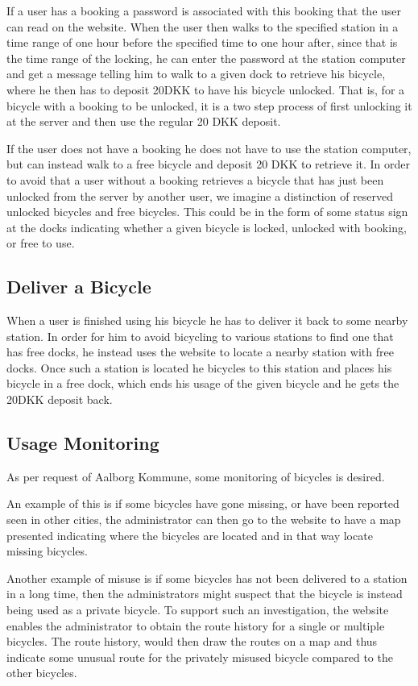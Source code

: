 If a user has a booking a password is associated with this booking that the user can read on the website.
When the user then walks to the specified station in a time range of one hour before the specified time to one hour after, since that is the time range of the locking, he can enter the password at the station computer and get a message telling him to walk to a given dock to retrieve his bicycle, where he then has to deposit 20DKK to have his bicycle unlocked.
That is, for a bicycle with a booking to be unlocked, it is a two step process of first unlocking it at the server and then use the regular 20 DKK deposit.

If the user does not have a booking he does not have to use the station computer, but can instead walk to a free bicycle and deposit 20 DKK to retrieve it.
In order to avoid that a user without a booking retrieves a bicycle that has just been unlocked from the server by another user, we imagine a distinction of reserved unlocked bicycles and free bicycles.
This could be in the form of some status sign at the docks indicating whether a given bicycle is locked, unlocked with booking, or free to use.

\subsection{Deliver a Bicycle}
When a user is finished using his bicycle he has to deliver it back to some nearby station.
In order for him to avoid bicycling to various stations to find one that has free docks, he instead uses the website to locate a nearby station with free docks.
Once such a station is located he bicycles to this station and places his bicycle in a free dock, which ends his usage of the given bicycle and he gets the 20DKK deposit back.

\subsection{Usage Monitoring}
As per request of Aalborg Kommune, some monitoring of bicycles is desired.

An example of this is if some bicycles have gone missing, or have been reported seen in other cities, the administrator can then go to the website to have a map presented indicating where the bicycles are located and in that way locate missing bicycles.

Another example of misuse is if some bicycles has not been delivered to a station in a long time, then the administrators might suspect that the bicycle is instead being used as a private bicycle. To support such an investigation, the website enables the administrator to obtain the route history for a single or multiple bicycles.
The route history, would then draw the routes on a map and thus indicate some unusual route for the privately misused bicycle compared to the other bicycles.

